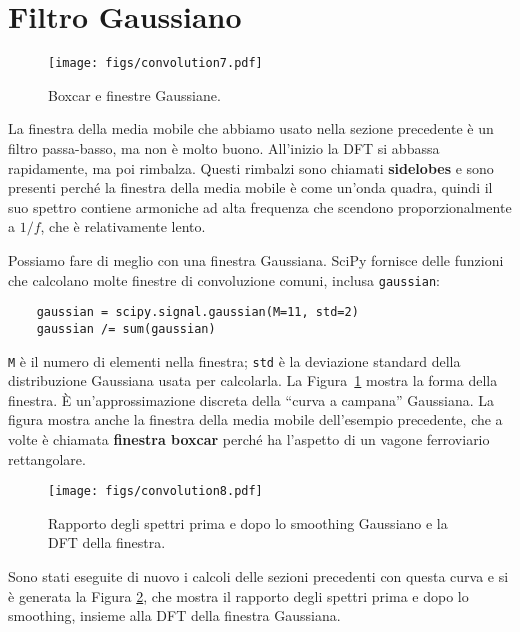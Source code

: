 \documentclass[12pt,a4paper]{book}
\begin{document}
\section{Filtro Gaussiano} 

\begin{figure} 

\centerline{\texttt{[image: figs/convolution7.pdf]}} \caption{Boxcar e finestre Gaussiane.} \label{fig.convolution7} \end{figure} 

La finestra della media mobile che abbiamo usato nella sezione precedente è un filtro passa-basso, ma non è molto buono. All'inizio la DFT si abbassa rapidamente, ma poi rimbalza. Questi rimbalzi sono chiamati {\bf sidelobes} e sono presenti perché la finestra della media mobile è come un'onda quadra, quindi il suo spettro contiene armoniche ad alta frequenza che scendono proporzionalmente a $1/f$, che è relativamente lento.

Possiamo fare di meglio con una finestra Gaussiana. SciPy fornisce delle funzioni che calcolano molte finestre di convoluzione comuni, inclusa {\tt gaussian}:

\begin{verbatim} 
    gaussian = scipy.signal.gaussian(M=11, std=2)
    gaussian /= sum(gaussian)
 \end{verbatim} 

{\tt M} è il numero di elementi nella finestra; {\tt std} è la deviazione standard della distribuzione Gaussiana usata per calcolarla. La Figura~\ref{fig.convolution7} mostra la forma della finestra. È un'approssimazione discreta della ``curva a campana'' Gaussiana. La figura mostra anche la finestra della media mobile dell'esempio precedente, che a volte è chiamata {\bf finestra boxcar} perché ha l'aspetto di un vagone ferroviario rettangolare.

\begin{figure} 

\centerline{\texttt{[image: figs/convolution8.pdf]}} \caption{Rapporto degli spettri prima e dopo lo smoothing Gaussiano e la DFT della finestra.} \label{fig.convolution8} \end{figure} 

Sono stati eseguite di nuovo i calcoli delle sezioni precedenti con questa curva e si è generata la Figura \ref{fig.convolution8}, che mostra il rapporto degli spettri prima e dopo lo smoothing, insieme alla DFT della finestra Gaussiana.
\end{document}
